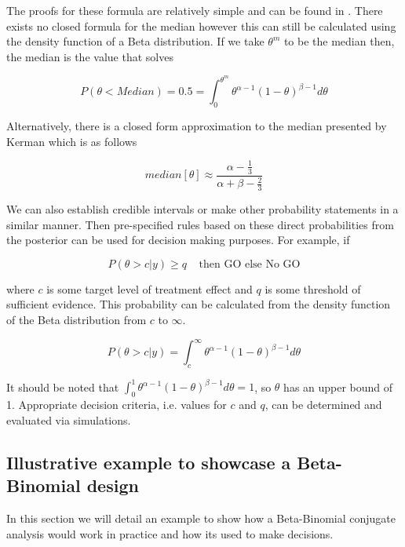 The proofs for these formula are relatively simple and can be found in \cite{sochBookStatisticalProofs2020}. There exists no closed formula for the median however this can still be calculated using the density function of a Beta distribution. If we take $\theta^m$ to be the median then, the median is the value that solves 

\begin{equation}
	P(\theta < Median) = 0.5 = \int_{0}^{\theta^m} \theta^{\alpha-1}(1-\theta)^{\beta-1}d\theta
\end{equation}

Alternatively, there is a closed form approximation to the median presented by Kerman \cite{kermanClosedformApproximationMedian2011} which is as follows 

\begin{equation}
	median[\theta] \approx \frac{\alpha - \frac{1}{3}}{\alpha + \beta - \frac{2}{3}}
\end{equation}

We can also establish credible intervals or make other probability statements in a similar manner. 
Then pre-specified rules based on these direct probabilities from the posterior can be used for decision making purposes. For example, if 

\begin{equation}
	\label{eq_etp:betafinaldecrule}
	P(\theta > c |y) \geq q  \; \; \; \; \text{then GO else No GO}
\end{equation}


where $c$ is some target level of treatment effect and $q$ is some threshold of sufficient evidence. This probability can be calculated from the density function of the Beta distribution from $c$ to $\infty$. 

\begin{equation}
	P(\theta > c | y) = \int_{c}^{\infty}\theta^{\alpha-1}(1-\theta)^{\beta-1}d\theta
\end{equation}

It should be noted that $\int_{0}^{1}\theta^{\alpha-1}(1-\theta)^{\beta-1}d\theta = 1$, so $\theta$ has an upper bound of 1. Appropriate decision criteria, i.e. values for $c$ and $q$, can be determined and evaluated via simulations.


\subsection{Illustrative example to showcase a Beta-Binomial design} 
\label{etp:BBIllEx}
In this section we will detail an example to show how a Beta-Binomial conjugate analysis would work in practice and how its used to make decisions. 

